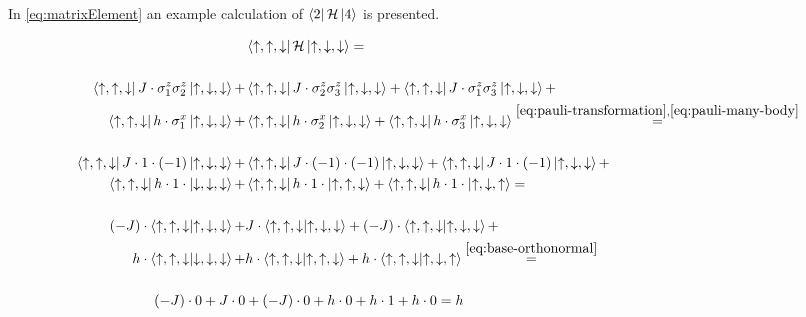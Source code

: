 In \ref{eq:matrixElement} an example calculation of $\bra{2}\mathcal{H}\ket{4}$ is presented.

\begin{equation}
    \label{eq:matrixElement}
    \begin{split}
        &\bra{\up, \up, \down} \hamiltonian \ket{\up, \down, \down} = \\\\ %
         \bra{\up, \up, \down} J\cdot \sigma^z_1\sigma^z_2 \ket{\up, \down, \down} +
         &\bra{\up, \up, \down} J\cdot \sigma^z_2\sigma^z_3 \ket{\up, \down, \down} +
         \bra{\up, \up, \down} J\cdot \sigma^z_1\sigma^z_3 \ket{\up, \down, \down} +\\
         \bra{\up, \up, \down} h\cdot \sigma^x_1 \ket{\up, \down, \down} +
         &\bra{\up, \up, \down} h\cdot \sigma^x_2 \ket{\up, \down, \down} +
         \bra{\up, \up, \down} h\cdot \sigma^x_3 \ket{\up, \down, \down}\stackrel{\ref{eq:pauli-transformation}, \ref{eq:pauli-many-body}}{=}\\\\ %
          \bra{\up, \up, \down} J\cdot  1 \cdot (-1) \ket{\up, \down, \down} +
         & \bra{\up, \up, \down} J\cdot (-1) \cdot (-1) \ket{\up, \down, \down} +
          \bra{\up, \up, \down} J\cdot  1 \cdot (-1) \ket{\up, \down, \down} +\\
          \bra{\up, \up, \down} h\cdot  1 \cdot \ket{\down, \down, \down} +
         & \bra{\up, \up, \down} h\cdot 1 \cdot \ket{\up, \up, \down} +
          \bra{\up, \up, \down} h\cdot  1 \cdot \ket{\up, \down, \up} =\\\\ %
          (-J)\cdot      \bra{\up, \up, \down}  \ket{\up, \down, \down} +
         & J\cdot        \bra{\up, \up, \down} \ket{\up, \down, \down} +
          (-J)\cdot      \bra{\up, \up, \down}  \ket{\up, \down, \down} +\\
          h\cdot         \bra{\up, \up, \down}  \ket{\down, \down, \down} +
         & h\cdot        \bra{\up, \up, \down} \ket{\up, \up, \down} +
          h\cdot         \bra{\up, \up, \down}  \ket{\up, \down, \up}\stackrel{\ref{eq:base-orthonormal}}{=}\\\\ %
          (-J)\cdot 0 + J\cdot 0 &+  (-J)\cdot 0 + h\cdot 0  + h\cdot 1 + h\cdot 0   = h 
    \end{split}
\end{equation}